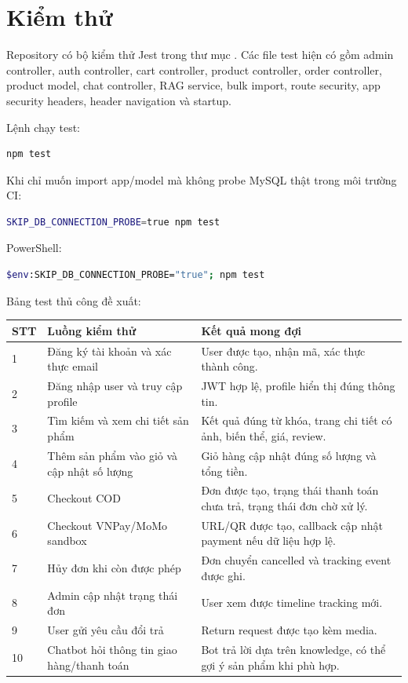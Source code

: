 \documentclass[12pt,a4paper]{report}
\begin{document}
\section{Kiểm thử}

Repository có bộ kiểm thử Jest trong thư mục . Các file test hiện có gồm admin controller, auth controller, cart controller, product controller, order controller, product model, chat controller, RAG service, bulk import, route security, app security headers, header navigation và startup.

Lệnh chạy test:

\begin{lstlisting}[language=bash]
npm test
\end{lstlisting}

Khi chỉ muốn import app/model mà không probe MySQL thật trong môi trường CI:

\begin{lstlisting}[language=bash]
SKIP_DB_CONNECTION_PROBE=true npm test
\end{lstlisting}

PowerShell:

\begin{lstlisting}[language=bash]
$env:SKIP_DB_CONNECTION_PROBE="true"; npm test
\end{lstlisting}

Bảng test thủ công đề xuất:

\begin{longtable}{|p{1cm}|p{6.5cm}|p{7.2cm}|}
\hline
\textbf{STT} & \textbf{Luồng kiểm thử} & \textbf{Kết quả mong đợi} \\
\hline
1 & Đăng ký tài khoản và xác thực email & User được tạo, nhận mã, xác thực thành công. \\
\hline
2 & Đăng nhập user và truy cập profile & JWT hợp lệ, profile hiển thị đúng thông tin. \\
\hline
3 & Tìm kiếm và xem chi tiết sản phẩm & Kết quả đúng từ khóa, trang chi tiết có ảnh, biến thể, giá, review. \\
\hline
4 & Thêm sản phẩm vào giỏ và cập nhật số lượng & Giỏ hàng cập nhật đúng số lượng và tổng tiền. \\
\hline
5 & Checkout COD & Đơn được tạo, trạng thái thanh toán chưa trả, trạng thái đơn chờ xử lý. \\
\hline
6 & Checkout VNPay/MoMo sandbox & URL/QR được tạo, callback cập nhật payment nếu dữ liệu hợp lệ. \\
\hline
7 & Hủy đơn khi còn được phép & Đơn chuyển cancelled và tracking event được ghi. \\
\hline
8 & Admin cập nhật trạng thái đơn & User xem được timeline tracking mới. \\
\hline
9 & User gửi yêu cầu đổi trả & Return request được tạo kèm media. \\
\hline
10 & Chatbot hỏi thông tin giao hàng/thanh toán & Bot trả lời dựa trên knowledge, có thể gợi ý sản phẩm khi phù hợp. \\
\hline
\end{longtable}
\end{document}

